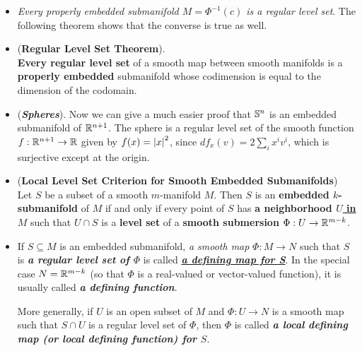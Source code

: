 \documentclass[11pt]{article}
\begin{document}
\begin{itemize}
\item \begin{remark}
\emph{Every properly embedded submanifold $M = \Phi^{-1}(c)$ is a regular level set}. The following theorem shows that the converse is true as well. 
\end{remark}

\item \begin{theorem} (\textbf{Regular Level Set Theorem}).  \citep{lee2003introduction}\\
\textbf{Every regular level set} of a smooth map between smooth manifolds is a \textbf{properly embedded} submanifold whose codimension is equal to the dimension of the codomain.
\end{theorem}

\item \begin{example} (\emph{\textbf{Spheres}}). Now we can give a much easier proof that ${\mathbb S}^n$ is an embedded submanifold of ${\mathbb R}^{n+1}$. The sphere is a regular level set of the smooth function $f: {\mathbb R}^{n+1} \rightarrow {\mathbb R}$ given by $f(x) = \left\lvert x \right\rvert^2$, since $df_x(v) = 2\sum_i x^i v^i$, which is
surjective except at the origin.
\end{example}



\item \begin{proposition} (\textbf{Local Level Set Criterion for Smooth Embedded Submanifolds})\\
Let $S$ be a subset of a smooth $m$-manifold $M$. Then $S$ is an \textbf{embedded $k$-submanifold} of $M$ if and only if every point of $S$ has \textbf{a neighborhood
\underline{$U$ in $M$}} such that \underline{$U \cap S$} is a \textbf{level set} of a \textbf{smooth submersion} $\Phi: U \rightarrow {\mathbb R}^{m-k}$.
\end{proposition}

\item \begin{definition}
If $S \subseteq M$ is an embedded submanifold, \emph{a smooth map} $\Phi: M \rightarrow N$ such that $S$ is \emph{\textbf{a regular level set of $\Phi$}} is called \underline{\emph{\textbf{a defining map for S}}}. In the special case $N = {\mathbb R}^{m-k}$ (so that $\Phi$ is a real-valued or vector-valued function), it is usually called \emph{\textbf{a defining function}}. 

More generally, if $U$ is an open subset of $M$ and $\Phi: U \rightarrow N$ is a smooth map such that $S \cap U$ is a regular level set of $\Phi$, then $\Phi$ is called \emph{\textbf{a local defining map (or local defining function) for $S$}}.
\end{definition}


\end{itemize}
\end{document}
